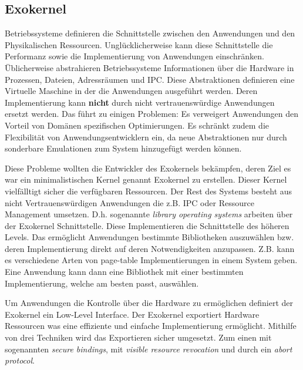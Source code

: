 \documentclass[german, 9pt,technote]{IEEEtran}
\begin{document}
    \subsection{Exokernel}       
      Betriebssysteme definieren die Schnittstelle zwischen den Anwendungen und den Physikalischen Ressourcen.
      Ungl\"ucklicherweise kann diese Schnittstelle die Performanz sowie die Implementierung von Anwendungen einschr\"anken. \"Ublicherweise
      abstrahieren Betriebssysteme Informationen \"uber die Hardware in Prozessen, Dateien, Adressr\"aumen und IPC. Diese Abstraktionen definieren eine 
      Virtuelle Maschine in der die Anwendungen ausgef\"uhrt werden. Deren Implementierung kann \textbf{nicht} durch nicht vertrauensw\"urdige Anwendungen
      ersetzt werden. Das f\"uhrt zu einigen Problemen: Es verweigert Anwendungen den Vorteil von Dom\"anen spezifischen Optimierungen.
      Es schr\"ankt zudem die Flexibilit\"at von Anwendungsentwicklern ein, da neue Abstraktionen nur durch sonderbare Emulationen zum
      System hinzugef\"ugt werden k\"onnen.
        
      Diese Probleme wollten die Entwickler des Exokernels bek\"ampfen, deren Ziel es war ein minimalistischen Kernel genannt Exokernel zu erstellen.
      Dieser Kernel vielf\"alltigt sicher die verf\"ugbaren Ressourcen. Der Rest des Systems besteht aus nicht Vertrauensw\"urdigen Anwendungen die
      z.B. IPC oder Ressource Management umsetzen. D.h. sogenannte \textit{library operating systems} arbeiten \"uber der Exokernel Schnittstelle. 
      Diese Implementieren die Schnittstelle des h\"oheren Levels. Das erm\"oglicht Anwendungen bestimmte Bibliotheken auszuw\"ahlen bzw.
      deren Implementierung direkt auf deren Notwendigkeiten anzupassen. Z.B. kann es verschiedene Arten von page-table Implementierungen
      in einem System geben. Eine Anwendung kann dann eine Bibliothek mit einer bestimmten Implementierung, welche am besten passt, ausw\"ahlen.
        
      Um Anwendungen die Kontrolle \"uber die Hardware zu erm\"oglichen definiert der Exokernel ein Low-Level Interface.
      Der Exokernel exportiert Hardware Ressourcen was eine effiziente und einfache Implementierung erm\"oglicht.
      Mithilfe von drei Techniken wird das Exportieren sicher umgesetzt. Zum einen mit sogenannten \textit{secure bindings}, 
      mit \textit{visible resource revocation} und durch ein \textit{abort protocol}. 
        
\end{document}
